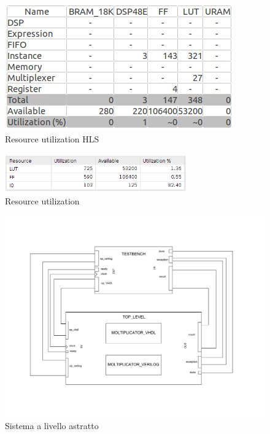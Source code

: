 \documentclass[]{IEEEtran}
\begin{document}
\appendix

\begin{figure}[bt]
	\centering
	\includegraphics[width=0.7\columnwidth]{figures/resource_utilization_hls.png}
	\caption{Resource utilization HLS}
	\label{fig:ruhls}
\end{figure}

\begin{figure}[bt]
	\centering
	\includegraphics[width=0.7\textwidth]{figures/resource_utilization.png}
	\caption{Resource utilization}
	\label{fig:ru}
\end{figure}

\begin{figure}[bt]
	\centering
	\includegraphics[width=\textwidth]{figures/abstract.pdf}
	\caption{Sistema a livello astratto}
	\label{fig:abstract}
\end{figure}
\end{document}
